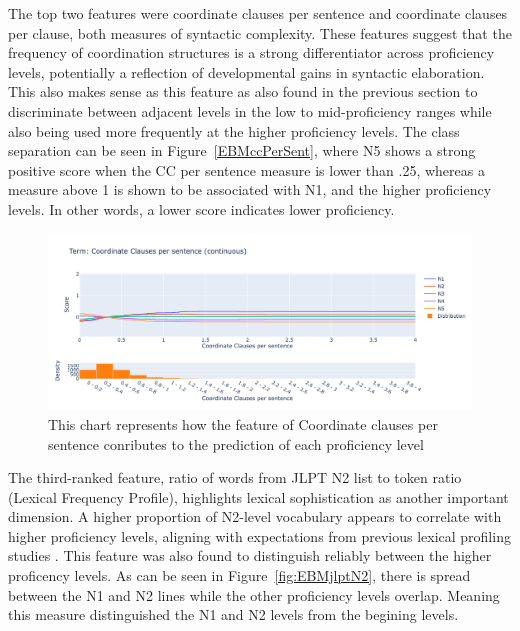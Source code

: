 The top two features were coordinate clauses per sentence and coordinate clauses per clause, both measures of
syntactic complexity. These features suggest that the frequency of coordination structures is a strong
differentiator across proficiency levels, potentially a reflection of developmental gains in syntactic elaboration. This
also makes sense as this feature as also found in the previous section to discriminate between adjacent levels in
the low to mid-proficiency ranges while also being used more frequently at the higher proficiency levels. The class
separation can be seen in Figure~\ref{EBMccPerSent}, where N5 shows a strong positive score when the CC per sentence
measure is lower than .25, whereas a measure above 1 is shown to be associated with N1, and the higher proficiency
levels. In other words, a lower score indicates lower
proficiency.

\begin{figure}[h!]
    \centering
    \includegraphics[scale=.4]{img/EBM/EBMccPerSent}
    \caption[Contribution of Coordinate Clauses per Sentence]{This chart represents how the feature of Coordinate clauses per sentence conributes to the prediction of each proficiency level}
    \label{fig:EBMccPerSent}
\end{figure}


The third-ranked feature, ratio of words from JLPT N2 list to token ratio (Lexical Frequency Profile), highlights
lexical sophistication as another important dimension. A higher proportion of N2-level vocabulary appears to
correlate with higher proficiency levels, aligning with expectations from previous lexical profiling studies
\citep{Laufer1995}. This feature was also found to distinguish reliably between the higher proficency levels. As can
be seen in Figure~\ref{fig:EBMjlptN2}, there is spread between the N1 and N2 lines while the other proficiency
levels overlap. Meaning this measure distinguished
the N1 and N2 levels from the begining levels.

